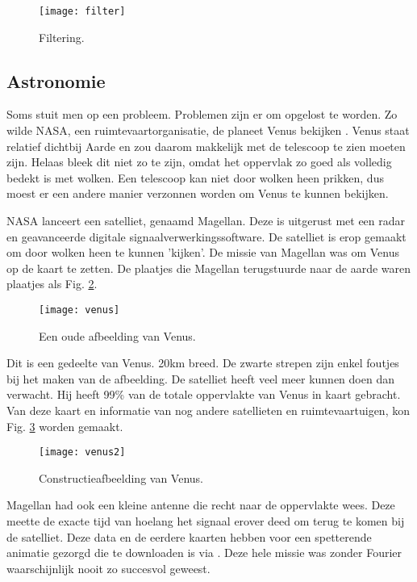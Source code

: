\documentclass[11pt,fleqn]{book} %
\begin{document}
\begin{figure}[h]
	\centering\texttt{[image: filter]}
	\caption{Filtering.}
	\label{fig:filter}
\end{figure}

\subsection{Astronomie}
Soms stuit men op een probleem. Problemen zijn er om opgelost te worden. Zo wilde NASA, een ruimtevaartorganisatie, de planeet Venus bekijken \cite{jg}. Venus staat relatief dichtbij Aarde en zou daarom makkelijk met de telescoop te zien moeten zijn. Helaas bleek dit niet zo te zijn, omdat het oppervlak zo goed als volledig bedekt is met wolken. Een telescoop kan niet door wolken heen prikken, dus moest er een andere manier verzonnen worden om Venus te kunnen bekijken.

NASA lanceert een satelliet, genaamd Magellan. Deze is uitgerust met een radar en geavanceerde digitale signaalverwerkingssoftware. De satelliet is erop gemaakt om door wolken heen te kunnen 'kijken'. De missie van Magellan was om Venus op de kaart te zetten. De plaatjes die Magellan terugstuurde naar de aarde waren plaatjes als Fig. \ref{fig:venus}.

\begin{figure}[h]
	\centering\texttt{[image: venus]}
	\caption{Een oude afbeelding van Venus.}
	\label{fig:venus}
\end{figure}

Dit is een gedeelte van Venus. 20km breed. De zwarte strepen zijn enkel foutjes bij het maken van de afbeelding. De satelliet heeft veel meer kunnen doen dan verwacht. Hij heeft 99\% van de totale oppervlakte van Venus in kaart gebracht. Van deze kaart en informatie van nog andere satellieten en ruimtevaartuigen, kon Fig. \ref{fig:venus2} worden gemaakt.

\begin{figure}[h]
	\centering\texttt{[image: venus2]}
	\caption{Constructieafbeelding van Venus.}
	\label{fig:venus2}
\end{figure}

Magellan had ook een kleine antenne die recht naar de oppervlakte wees. Deze meette de exacte tijd van hoelang het signaal erover deed om terug te komen bij de satelliet. Deze data en de eerdere kaarten hebben voor een spetterende animatie gezorgd die te downloaden is via \cite{jg}. Deze hele missie was zonder Fourier waarschijnlijk nooit zo succesvol geweest.
\end{document}
